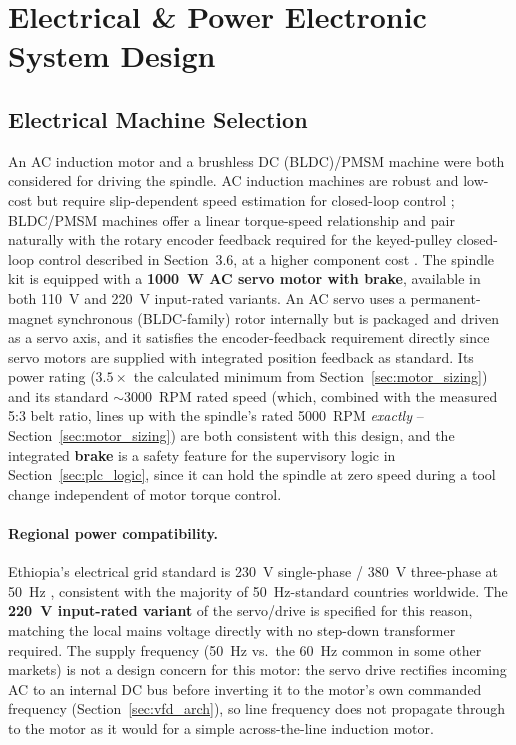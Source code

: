 \documentclass[12pt,a4paper]{report}
\begin{document}
	\section{Electrical \& Power Electronic System Design}
	
	\subsection{Electrical Machine Selection}\label{sec:machine_selection}
	An AC induction motor and a brushless DC (BLDC)/PMSM machine were both considered for
	driving the spindle. AC induction machines are robust and low-cost but require
	slip-dependent speed estimation for closed-loop control \cite{ref4}; BLDC/PMSM machines offer
	a linear torque-speed relationship and pair naturally with the rotary encoder feedback
	required for the keyed-pulley closed-loop control described in Section~3.6, at a higher
	component cost \cite{ref8}. The spindle kit is equipped with a \textbf{1000~W AC servo
		motor with brake}, available in both 110~V and 220~V input-rated variants. An AC servo
	uses a permanent-magnet synchronous (BLDC-family) rotor internally but is packaged and
	driven as a servo axis, and it satisfies the encoder-feedback requirement directly since
	servo motors are supplied with integrated position feedback as standard. Its power rating
	($3.5\times$ the calculated minimum from Section~\ref{sec:motor_sizing}) and its standard
	$\sim$3000~RPM rated speed (which, combined with the measured 5:3 belt ratio, lines up
	with the spindle's rated 5000~RPM \emph{exactly} -- Section~\ref{sec:motor_sizing}) are both
	consistent with this design, and the integrated \textbf{brake} is a safety feature for the
	supervisory logic in Section~\ref{sec:plc_logic}, since it can hold the spindle at zero speed during a tool
	change independent of motor torque control.
	
	\paragraph{Regional power compatibility.}
	Ethiopia's electrical grid standard is 230~V
	single-phase / 380~V three-phase at 50~Hz \cite{ref18}, consistent with the majority of
	50~Hz-standard countries worldwide. The \textbf{220~V input-rated variant} of the
	servo/drive is specified for this reason, matching the local mains voltage directly with no
	step-down transformer required. The supply frequency (50~Hz vs.\ the 60~Hz common in some
	other markets) is not a design concern for this motor: the servo drive rectifies incoming AC
	to an internal DC bus before inverting it to the motor's own commanded frequency
	(Section~\ref{sec:vfd_arch}), so line frequency does not propagate through to the motor as it would for a
	simple across-the-line induction motor.
	
\end{document}
